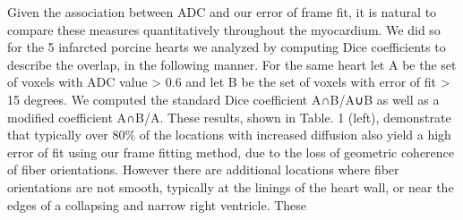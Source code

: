 Given the association between ADC and our error of frame fit, it is natural to compare these measures quantitatively throughout the myocardium. We did so for the 5 infarcted porcine hearts we analyzed by computing Dice coefficients to describe the overlap, in the following manner. For the same heart let A be the set of voxels with ADC value > 0.6 and let B be the set of voxels with error of fit > 15 degrees. We computed the standard Dice coefficient A∩B/A∪B as well as a modified coefficient A∩B/A. These results, shown in Table. 1 (left), demonstrate that typically over 80\% of the locations with increased diffusion also yield a high error of fit using our frame fitting method, due to the loss of geometric coherence of fiber orientations. However there are additional locations where fiber orientations are not smooth, typically at the linings of the heart wall, or near the edges of a collapsing and narrow right ventricle. These